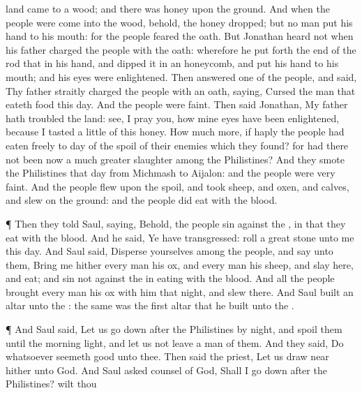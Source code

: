 {land
came to a
wood; and there was
honey
upon the
ground.
And when the
people were
come into the
wood, behold, the
honey
dropped; but no man
put his
hand to his
mouth: for the
people
feared the
oath.
But
Jonathan
heard not when his
father
charged the
people with the
oath: wherefore he put
forth the
end of the
rod that
{} in his
hand, and
dipped it in an
honeycomb, and
put his
hand to his
mouth; and his
eyes were
enlightened.
Then
answered
one of the
people, and
said, Thy
father
straitly
charged the
people with an
oath,
saying,
Cursed
{} the
man that
eateth
{}
food this
day. And the
people were
faint.
Then
said
Jonathan, My
father hath
troubled the
land:
see, I pray you, how mine
eyes have been
enlightened, because I
tasted a
little of this
honey.
How much
more, if
haply the
people had
eaten
freely to
day of the
spoil of their
enemies which they
found? for had there not been now a much
greater
slaughter among the
Philistines?
And they
smote the
Philistines that
day from
Michmash to
Aijalon: and the
people were
very
faint.
And the
people
flew upon the
spoil, and
took
sheep, and
oxen, and
calves, and
slew
{} on the
ground: and the
people did
eat
{} with the
blood.
\par }{\PP {}¶ Then they
told
Saul,
saying, Behold, the
people
sin against the
{}, in that they
eat with the
blood. And he
said, Ye have
transgressed:
roll a
great
stone unto me this
day.
And
Saul
said,
Disperse yourselves among the
people, and
say unto them, Bring me
hither every
man his
ox, and every
man his
sheep, and
slay
{} here, and
eat; and
sin not against the
{} in
eating with the
blood. And all the
people
brought every
man his
ox with
him that
night, and
slew
{} there.
And
Saul
built an
altar unto the
{}: the same was the
first
altar that he
built unto the
{}.
\par }{\PP {}¶ And
Saul
said, Let us go
down
after the
Philistines by
night, and
spoil them until the
morning
light, and let us not
leave a
man of them. And they
said,
Do whatsoever
seemeth
good unto thee. Then
said the
priest, Let us draw
near
hither unto
God.
And
Saul
asked counsel of
God, Shall I go
down
after the
Philistines? wilt thou
}
